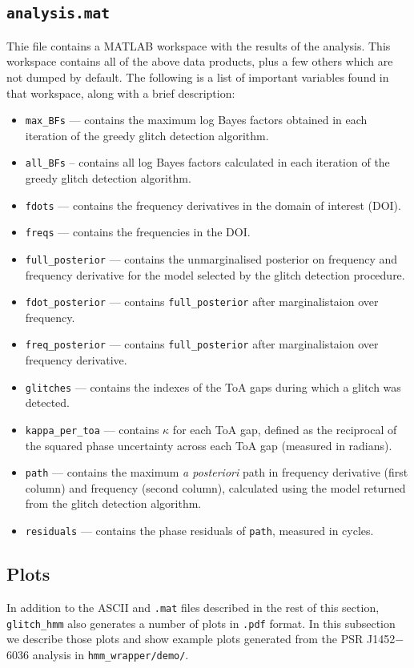 \documentclass{article}
\newcommand{\glitchhmm}{\texttt{glitch\_hmm}}
\begin{document}
\subsection{\texttt{analysis.mat}}
Thie file contains a MATLAB workspace with the results of the analysis. 
This workspace contains all of the above data products, plus a few others which are not dumped by default.
The following is a list of important variables found in that workspace, along with a brief description:
\begin{itemize}
    \item \texttt{max\_BFs} --- contains the maximum log Bayes factors obtained in each iteration of the greedy glitch detection algorithm.
    \item \texttt{all\_BFs} -- contains all log Bayes factors calculated in each iteration of the greedy glitch detection algorithm.
    \item \texttt{fdots} --- contains the frequency derivatives in the domain of interest (DOI).
    \item \texttt{freqs} --- contains the frequencies in the DOI.
    \item \texttt{full\_posterior} --- contains the unmarginalised posterior on frequency and frequency derivative for the model selected by the glitch detection procedure.
    \item \texttt{fdot\_posterior} --- contains \texttt{full\_posterior} after marginalistaion over frequency.
    \item \texttt{freq\_posterior} --- contains \texttt{full\_posterior} after marginalistaion over frequency derivative.
    \item \texttt{glitches} --- contains the indexes of the ToA gaps during which a glitch was detected.
    \item \texttt{kappa\_per\_toa} --- contains $\kappa$ for each ToA gap, defined as the reciprocal of the squared phase uncertainty across each ToA gap (measured in radians).
    \item \texttt{path} --- contains the maximum \emph{a posteriori} path in frequency derivative (first column) and frequency (second column), calculated using the model returned from the glitch detection algorithm.
    \item \texttt{residuals} --- contains the phase residuals of \texttt{path}, measured in cycles.
\end{itemize}

\subsection{Plots}
In addition to the ASCII and \texttt{.mat} files described in the rest of this section, \glitchhmm{} also generates a number of plots in \texttt{.pdf} format.
In this subsection we describe those plots and show example plots generated from the PSR J1452$-$6036 analysis in \texttt{hmm\_wrapper/demo/}.
\end{document}
